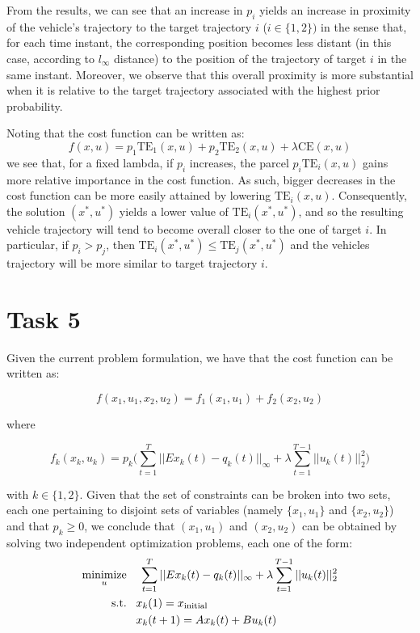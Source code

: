 \documentclass[12pt]{article}
\DeclareMathOperator*{\minimize}{minimize}
\begin{document}
From the results, we can see that an increase in $p_i$ yields an increase in proximity of the vehicle's trajectory to the target trajectory $i$ ($i \in \{1, 2\})$ in the sense that, for each time instant, the corresponding position becomes less distant (in this case, according to $l_{\infty}$ distance) to the position of the trajectory of target $i$ in the same instant. Moreover, we observe that this overall proximity is more substantial when it is relative to the target trajectory associated with the highest prior probability.

Noting that the cost function can be written as:
\[
    f(x, u) = p_1 \text{TE}_1(x, u) + p_2 \text{TE}_2(x, u) + \lambda \text{CE}(x, u)
\]
we see that, for a fixed lambda, if $p_i$ increases, the parcel $p_i \text{TE}_i(x, u)$ gains more relative importance in the cost function. As such, bigger decreases in the cost function can be more easily attained by lowering $\text{TE}_i(x, u)$. Consequently, the solution $(x^*, u^*)$ yields a lower value of $\text{TE}_i(x^*, u^*)$, and so the resulting vehicle trajectory will tend to become overall closer to the one of target $i$. In particular, if $p_i > p_j$, then  $\text{TE}_i(x^*, u^*) \le \text{TE}_j(x^*, u^*)$ and the vehicles trajectory will be more similar to target trajectory $i$.

\section{Task 5}

Given the current problem formulation, we have that the cost function can be written as:

\[
    f(x_1, u_1, x_2, u_2) = f_1(x_1, u_1) + f_2(x_2, u_2)
\]

where

\[
    f_k(x_k, u_k) = p_k \bigg( \sum_{t=1}^{T} ||Ex_k(t) - q_k(t)||_{\infty} +
    \lambda \sum_{t=1}^{T-1} ||u_k(t)||_{2}^2 \bigg)
\]

with $k \in \{1, 2\}$. Given that the set of constraints can be broken into two sets, each one pertaining to disjoint sets of variables (namely $\{x_1, u_1\}$ and $\{x_2, u_2\}$) and that $p_k \ge 0$, we conclude that $(x_1, u_1)$ and $(x_2, u_2)$ can be obtained by solving two independent optimization problems, each one of the form:
\vspace{-0.5em}
\begin{align*}
    \minimize_{u}& \hspace*{0.4cm} \sum_{t=1}^{T} ||Ex_k(t) - q_k(t)||_{\infty} +
    \lambda \sum_{t=1}^{T-1} ||u_k(t)||_{2}^2 \\
    \text{s.t.}& \;\;\; x_k(1) = x_{\text{initial}} \\ 
    & \;\;\; x_k(t + 1) = Ax_k(t) + Bu_k(t)
\end{align*}
\end{document}
